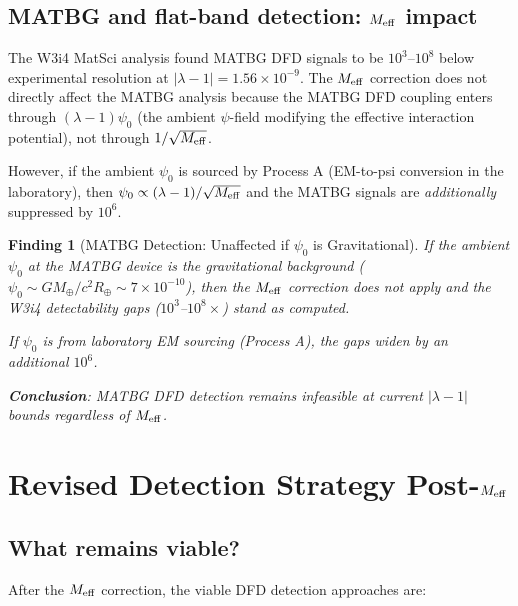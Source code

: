 \documentclass[11pt]{article}
\newtheorem{finding}{Finding}
\newcommand{\ee}[1]{\times 10^{#1}}
\newcommand{\lambdaone}{|\lambda-1|}
\newcommand{\Meff}{M_{\rm eff}}
\newcommand{\lambdabound}{1.56\ee{-9}}
\begin{document}
\subsection{MATBG and flat-band detection: $M_{\rm eff}$ impact}

The W3i4 MatSci analysis found MATBG DFD signals to be $10^3$--$10^8$
below experimental resolution at $\lambdaone = \lambdabound$.
The $M_{\rm eff}$ correction does not directly affect the MATBG analysis
because the MATBG DFD coupling enters through $(\lambda-1)\psi_0$
(the ambient $\psi$-field modifying the effective interaction potential),
not through $1/\sqrt{\Meff}$.

However, if the ambient $\psi_0$ is sourced by Process A (EM-to-psi
conversion in the laboratory), then $\psi_0 \propto (\lambda-1)/\sqrt{\Meff}$
and the MATBG signals are \emph{additionally} suppressed by $10^6$.

\begin{finding}[MATBG Detection: Unaffected if $\psi_0$ is Gravitational]
\label{find:MATBG-Meff}
If the ambient $\psi_0$ at the MATBG device is the gravitational
background ($\psi_0 \sim GM_\oplus/c^2 R_\oplus \sim 7\ee{-10}$), then
the $M_{\rm eff}$ correction does not apply and the W3i4 detectability
gaps ($10^3$--$10^8\times$) stand as computed.

If $\psi_0$ is from laboratory EM sourcing (Process A), the gaps widen
by an additional $10^6$.

\textbf{Conclusion}: MATBG DFD detection remains infeasible at current
$\lambdaone$ bounds regardless of $M_{\rm eff}$.
\end{finding}

\section{Revised Detection Strategy Post-$M_{\rm eff}$}
\label{sec:revised-strategy}

\subsection{What remains viable?}

After the $M_{\rm eff}$ correction, the viable DFD detection approaches are:
\end{document}
